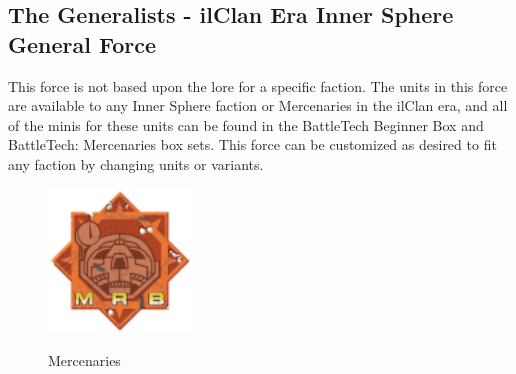 \subsection{The Generalists - ilClan Era Inner Sphere General Force}

This force is not based upon the lore for a specific faction.
The units in this force are available to any Inner Sphere faction or Mercenaries in the ilClan era, and all of the minis for these units can be found in the BattleTech Beginner Box and BattleTech: Mercenaries box sets.
This force can be customized as desired to fit any faction by changing units or variants.

\begin{figure}[!h]
  \centering
  \includegraphics[alt='Mercenary Logo', width=1.5in, height=1.5in]{img/Mercenary.png}
  \caption*{Mercenaries}
\end{figure}


